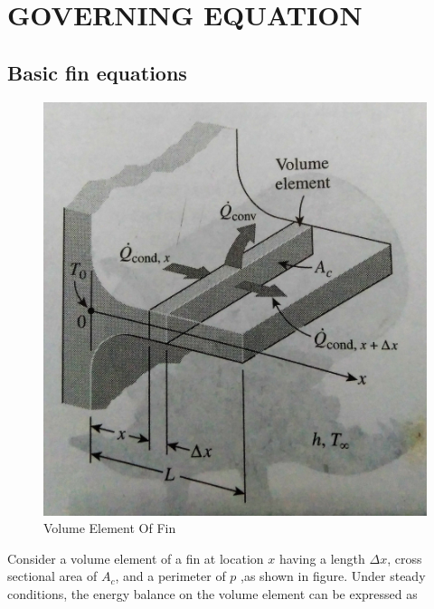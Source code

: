 



\chapter{GOVERNING EQUATION}  %



\section{Basic fin equations}


\begin{figure}[h]
	\label{ss}    %
	\centering
	\includegraphics[width= 6 cm]{102.jpg}
	\caption{ Volume Element Of Fin }
\end{figure}


Consider a volume element of a fin at location $x$ having a length $ \Delta x $, cross sectional area of $ A_c $, and a perimeter of $ p $ ,as shown in figure. Under steady conditions, the energy balance on the volume element can be expressed as 

